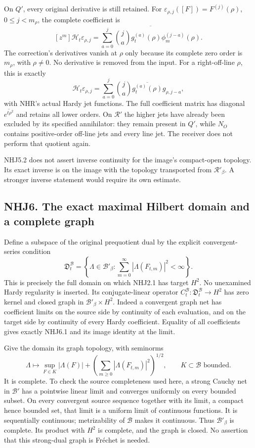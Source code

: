 On \(Q'\), every original derivative is still retained. For
\(\varepsilon_{\rho,j}([F])=F^{(j)}(\rho)\), \(0\le j<m_\rho\), the
complete coefficient is \[
[z^m]\mathcal H_t\varepsilon_{\rho,j}
=\overline{\sum_{a=0}^j\binom ja
g_t^{(a)}(\rho)\phi_m^{(j-a)}(\rho)}.
\tag{NHJ5.3}
\] The correction's derivatives vanish at \(\rho\) only because its
complete zero order is \(m_\rho\), with \(\rho\ne0\). No derivative is
removed from the input. For a right-off-line \(\rho\), this is exactly
\[
\mathcal H_t\varepsilon_{\rho,j}
=\sum_{a=0}^j\binom ja\overline{g_t^{(a)}(\rho)}g_{\rho,j-a},
\tag{NHJ5.4}
\] with NHR's actual Hardy jet functions. The full coefficient matrix
has diagonal \(\overline{e^{t\rho^2}}\) and retains all lower orders. On
\(\mathcal R'\) the higher jets have already been excluded by its
specified annihilator: they remain present in \(Q'\), while \(N_O\)
contains positive-order off-line jets and every line jet. The receiver
does not perform that quotient again.

NHJ5.2 does not assert inverse continuity for the image's compact-open
topology. Its exact inverse is on the image with the topology
transported from \(\mathcal R'_\beta\). A stronger inverse statement
would require its own estimate.

\subsection{NHJ6. The exact maximal Hilbert domain and a complete
graph}\label{nhj6.-the-exact-maximal-hilbert-domain-and-a-complete-graph}

Define a subspace of the original prequotient dual by the explicit
convergent-series condition \[
\mathfrak D_t^{\mathcal B}=
\left\{\Lambda\in\mathcal B'_\beta:
\sum_{m=0}^\infty|\Lambda(F_{t,m})|^2<\infty\right\}.
\tag{NHJ6.1}
\] This is precisely the full domain on which NHJ2.1 has target \(H^2\).
No unexamined Hardy regularity is inserted. Its conjugate-linear
operator \(C_t^{\mathcal B}:\mathfrak D_t^{\mathcal B}\to H^2\) has zero
kernel and closed graph in \(\mathcal B'_\beta\times H^2\). Indeed a
convergent graph net has coefficient limits on the source side by
continuity of each evaluation, and on the target side by continuity of
every Hardy coefficient. Equality of all coefficients gives exactly
NHJ6.1 and its image identity at the limit.

Give the domain its graph topology, with seminorms \[
\Lambda\longmapsto
\sup_{F\in K}|\Lambda(F)|+
\left(\sum_{m\ge0}|\Lambda(F_{t,m})|^2\right)^{1/2},
\qquad K\subset\mathcal B\text{ bounded}.
\tag{NHJ6.2}
\] It is complete. To check the source completeness used here, a strong
Cauchy net in \(\mathcal B'\) has a pointwise linear limit and converges
uniformly on every bounded subset. On every convergent source sequence
together with its limit, a compact hence bounded set, that limit is a
uniform limit of continuous functions. It is sequentially continuous;
metrizability of \(\mathcal B\) makes it continuous. Thus
\(\mathcal B'_\beta\) is complete. Its product with \(H^2\) is complete,
and the graph is closed. No assertion that this strong-dual graph is
Fréchet is needed.

